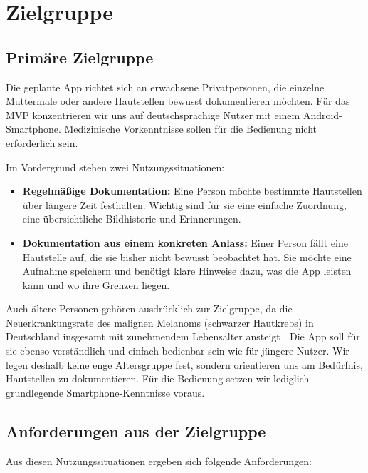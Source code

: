 \section{Zielgruppe}
\label{chap:zielgruppe}

\subsection{Primäre Zielgruppe}
\label{sec:zielgruppe-primaer}

Die geplante App richtet sich an erwachsene Privatpersonen, die einzelne Muttermale oder andere Hautstellen bewusst dokumentieren möchten. Für das MVP konzentrieren wir uns auf deutschsprachige Nutzer mit einem Android-Smartphone. Medizinische Vorkenntnisse sollen für die Bedienung nicht erforderlich sein.

Im Vordergrund stehen zwei Nutzungssituationen:

\begin{itemize}
\item \textbf{Regelmäßige Dokumentation:} Eine Person möchte bestimmte Hautstellen über längere Zeit festhalten. Wichtig sind für sie eine einfache Zuordnung, eine übersichtliche Bildhistorie und Erinnerungen.
\item \textbf{Dokumentation aus einem konkreten Anlass:} Einer Person fällt eine Hautstelle auf, die sie bisher nicht bewusst beobachtet hat. Sie möchte eine Aufnahme speichern und benötigt klare Hinweise dazu, was die App leisten kann und wo ihre Grenzen liegen.
\end{itemize}

Auch ältere Personen gehören ausdrücklich zur Zielgruppe, da die Neuerkrankungsrate des malignen Melanoms (schwarzer Hautkrebs) in Deutschland insgesamt mit zunehmendem Lebensalter ansteigt \cite{S3Hautkrebspraevention2026}. Die App soll für sie ebenso verständlich und einfach bedienbar sein wie für jüngere Nutzer. Wir legen deshalb keine enge Altersgruppe fest, sondern orientieren uns am Bedürfnis, Hautstellen zu dokumentieren. Für die Bedienung setzen wir lediglich grundlegende Smartphone-Kenntnisse voraus.

\subsection{Anforderungen aus der Zielgruppe}
\label{sec:zielgruppe-anforderungen}

Aus diesen Nutzungssituationen ergeben sich folgende Anforderungen:

